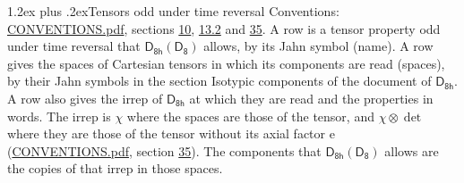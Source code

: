 \documentclass[10pt,a4paper]{article}
\makeatletter
\renewcommand\section{\@startsection{section}{1}{\z@}{-3ex plus -1ex minus -.2ex}%
  {1.2ex plus .2ex}{\normalfont\large\sffamily\bfseries\color{parttitle}}}
\numberwithin{equation}{section}
\newcommand{\grp}[1]{\mathsf{#1}}
\newcommand{\irrprod}{\otimes}
\makeatother
\begin{document}
\section{Tensors odd under time reversal}\label{s:time_odd}
Conventions: \href{../../CONVENTIONS.pdf}{CONVENTIONS.pdf}, sections \href{../../../rotation/CONVENTIONS.pdf\#conv.10}{10}, \href{../../../rotation/CONVENTIONS.pdf\#conv.13.2}{13.2} and \href{../../CONVENTIONS.pdf\#conv.35}{35}.
\leavevmode\label{n:head.name.property}A row is a tensor property odd under time reversal that $\grp{D_{8h}}(\grp{D_{8}})$ allows, by its Jahn symbol (name). \label{n:head.spaces}A row gives the spaces of Cartesian tensors in which its components are read (spaces), by their Jahn symbols in the section Isotypic components of the document of \href{../../../rotation/data/pdf/D8h.pdf}{$\grp{D_{8h}}$}. \label{n:head.properties}A row also gives the irrep of $\grp{D_{8h}}$ at which they are read and the properties in words. The irrep is $\chi$ where the spaces are those of the tensor, and $\chi \irrprod \det$ where they are those of the tensor without its axial factor e (\href{../../CONVENTIONS.pdf}{CONVENTIONS.pdf}, section \href{../../CONVENTIONS.pdf\#conv.35}{35}). The components that $\grp{D_{8h}}(\grp{D_{8}})$ allows are the copies of that irrep in those spaces.
\end{document}
